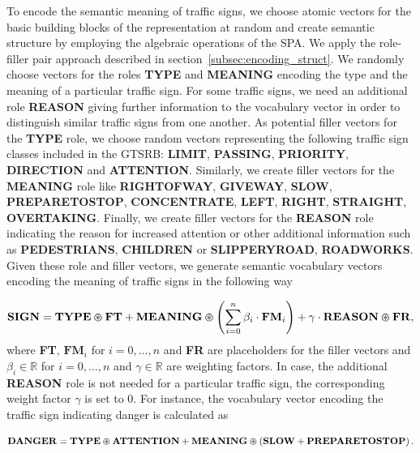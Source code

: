 To encode the semantic meaning of traffic signs, we choose atomic vectors for the basic building blocks of the representation at random and create semantic structure by employing the algebraic operations of the \ac{SPA}.
We apply the role-filler pair approach described in section~\ref{subsec:encoding_struct}.
We randomly choose vectors for the roles \textbf{TYPE} and \textbf{MEANING} encoding the type and the meaning of a particular traffic sign.
For some traffic signs, we need an additional role \textbf{REASON} giving further information to the vocabulary vector in order to distinguish similar traffic signs from one another.
As potential filler vectors for the \textbf{TYPE} role, we choose random vectors representing the following traffic sign classes included in the \ac{GTSRB}: \textbf{LIMIT}, \textbf{PASSING}, \textbf{PRIORITY}, \textbf{DIRECTION} and \textbf{ATTENTION}.
Similarly, we create filler vectors for the \textbf{MEANING} role like \textbf{RIGHTOFWAY}, \textbf{GIVEWAY}, \textbf{SLOW}, \textbf{PREPARETOSTOP}, \textbf{CONCENTRATE}, \textbf{LEFT}, \textbf{RIGHT}, \textbf{STRAIGHT}, \textbf{OVERTAKING}.
Finally, we create filler vectors for the \textbf{REASON} role indicating the reason for increased attention or other additional information such as \textbf{PEDESTRIANS}, \textbf{CHILDREN} or \textbf{SLIPPERYROAD}, \textbf{ROADWORKS}.
Given these role and filler vectors, we generate semantic vocabulary vectors encoding the meaning of traffic signs in the following way

\begin{equation}
    \label{eq:semantic_vocab_traffic_signs}
    \mathbf{SIGN} = \mathbf{TYPE} \varoast \mathbf{FT} + \mathbf{MEANING} \varoast \left( \sum\limits_{i=0}^{n} \beta_{i} \cdot  \mathbf{FM}_{i}  \right) + \gamma \cdot \mathbf{REASON} \varoast \mathbf{FR}, 
\end{equation}
where \textbf{FT}, $\mathbf{FM}_{i}$ for $i = 0, \ldots, n$ and \textbf{FR} are placeholders for the filler vectors and $\beta_{i} \in \mathbb{R} $ for $i = 0, \ldots, n$ and $\gamma \in \mathbb{R} $ are weighting factors.
In case, the additional \textbf{REASON} role is not needed for a particular traffic sign, the corresponding weight factor $\gamma$ is set to \num{0}.
For instance, the vocabulary vector encoding the traffic sign indicating danger is calculated as

\begin{equation}
\label{eq:semantic_vocab_traffic_sign_example}
\mathbf{DANGER} = \mathbf{TYPE} \varoast \mathbf{ATTENTION} + \mathbf{MEANING} \varoast  \left(\mathbf{SLOW} + \mathbf{PREPARETOSTOP}\right).
\end{equation}


